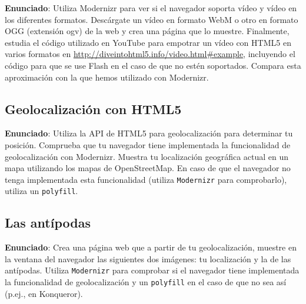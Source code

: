 \textbf{Enunciado}: Utiliza Modernizr para ver si el navegador soporta vídeo y vídeo en los diferentes formatos. Descárgate un vídeo en formato WebM o otro en formato OGG (extensión ogv) de la web y crea una página que lo muestre. Finalmente, estudia el código utilizado en YouTube para empotrar un vídeo con HTML5 en varios formatos en \url{http://diveintohtml5.info/video.html#example}, incluyendo el código para que se use Flash en el caso de que no estén soportados. Compara esta aproximación con la que hemos utilizado con Modernizr.

\subsection{Geolocalización con HTML5}
\label{subsec:geolocalizacion}

\textbf{Enunciado}: Utiliza la API de HTML5 para geolocalización para determinar tu posición. Comprueba que tu navegador tiene implementada la funcionalidad de geolocalización con Modernizr. Muestra tu localización geográfica actual en un mapa utilizando los mapas de OpenStreetMap. En caso de que el navegador no tenga implementada esta funcionalidad (utiliza \texttt{Modernizr} para comprobarlo), utiliza un \texttt{polyfill}.


\subsection{Las antípodas}
\label{subsec:antipodas}

\textbf{Enunciado}: Crea una página web que a partir de tu geolocalización, muestre en la ventana del navegador las siguientes dos imágenes: tu localización y la de las antípodas. Utiliza \texttt{Modernizr} para comprobar si el navegador tiene implementada la funcionalidad de geolocalización y un \texttt{polyfill} en el caso de que no sea así (p.ej., en Konqueror).



